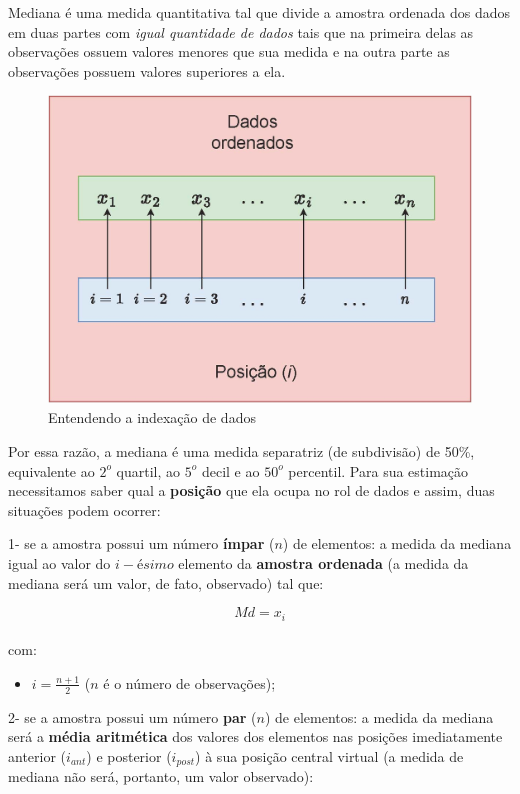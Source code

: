 \documentclass[
]{book}
\providecommand{\tightlist}{%
  \setlength{\itemsep}{0pt}\setlength{\parskip}{0pt}}
\begin{document}
\hfill\break

Mediana é uma medida quantitativa tal que divide a amostra ordenada dos dados em duas partes com \emph{igual quantidade de dados} tais que na primeira delas as observações ossuem valores menores que sua medida e na outra parte as observações possuem valores superiores a ela.

\hfill\break

\begin{figure}

{\centering \includegraphics[width=0.6\linewidth]{images3/vetor_posicao} 

}

\caption{Entendendo a indexação de dados}\label{fig:unnamed-chunk-24}
\end{figure}

\hfill\break

Por essa razão, a mediana é uma medida separatriz (de subdivisão) de 50\%, equivalente ao \(2^{o}\) quartil, ao \(5^{o}\) decil e ao \(50^{o}\) percentil. Para sua estimação necessitamos saber qual a \textbf{posição} que ela ocupa no rol de dados e assim, duas situações podem ocorrer:

\hfill\break

1- se a amostra possui um número \textbf{ímpar} (\(n\)) de elementos: a medida da mediana igual ao valor do \(i-ésimo\) elemento da \textbf{amostra ordenada} (a medida da mediana será um valor, de fato, observado) tal que:

\[
Md=x_{i} 
\]\\

com:

\begin{itemize}
\tightlist
\item
  \(i=\frac{n+1}{2}\) (\(n\) é o número de observações);
\end{itemize}

\hfill\break

2- se a amostra possui um número \textbf{par} (\(n\)) de elementos: a medida da mediana será a \textbf{média aritmética} dos valores dos elementos nas posições imediatamente anterior (\(i_{ant}\)) e posterior (\(i_{post}\)) à sua posição central virtual (a medida de mediana não será, portanto, um valor observado):
\end{document}
